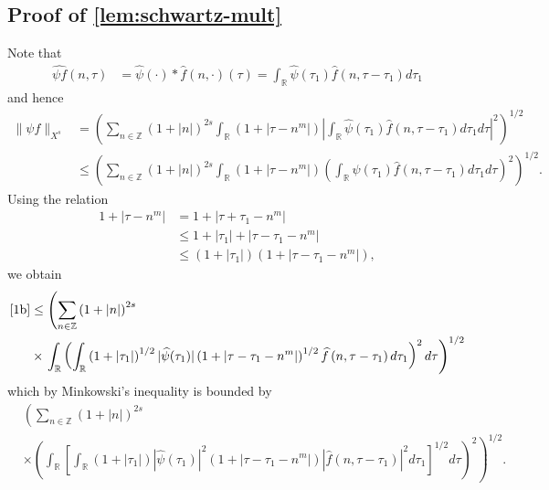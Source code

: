 \documentclass[12pt,reqno]{amsart}
\numberwithin{equation}{section}  %
\numberwithin{figure}{section}
\newcommand{\rr}{\mathbb{R}}
\newcommand{\zz}{\mathbb{Z}}
\newcommand{\wh}{\widehat}
\theoremstyle{plain}
\theoremstyle{definition}
\theoremstyle{remark}
\begin{document}
\subsection{Proof of \autoref{lem:schwartz-mult}}
Note that
%
%
\begin{equation*}
	\begin{split}
		\wh{\psi f}\left( n, \tau \right)
		& = \wh{\psi}(\cdot) * \wh{f}(n,
		\cdot)(\tau)
		= \int_\rr \wh{\psi}(\tau_1) \wh{f} \left( n, \tau - \tau_1 \right) 
		d\tau_1
	\end{split}
\end{equation*}
%
%
and hence
%
%
\begin{equation}
	\label{1b}
	\begin{split}
		\|\psi f\|_{X^s} 
		& = \left( \sum_{n \in \zz} \left (1 + |n| \right )^{2s} \int_\rr \left( 1 + | \tau -
		n^{m} | \right) | \int_\rr \wh{\psi}(\tau_1) \wh{f}\left( n, \tau -
		\tau_1
		\right)  d \tau_1 d \tau |^2 \right)^{1/2}
		\\
		& \le \left( \sum_{n \in \zz} \left (1 + |n| \right )^{2s} \int_\rr \left( 1 + | \tau -
		n^{m }
		|
		\right) \left( \int_\rr \wh{\psi}\left( \tau_1 \right) \wh{f}\left( n,
		\tau - \tau_1
		\right)  d \tau_1 d \tau \right)^2 \right)^{1/2}.
	\end{split}
\end{equation}
%
%
Using the relation
%
%
\begin{equation*}
	\begin{split}
		1 + | \tau - n^{m } |
		& = 1 + | \tau + \tau_1 - n^{m} |
		\\
		& \le 1 + | \tau_1 | + | \tau - \tau_1 - n^{m} |
		\\
		& \le \left( 1 + | \tau_1 | \right)\left( 1 + | \tau - \tau_1 -
		n^{m} | \right),
	\end{split}
\end{equation*}
%
%
we obtain
%
%
\begin{equation*}
	\begin{split}
		\eqref{1b}
		& \le \left( \sum_{n \in \zz} \left (1 + |n| \right )^{2s} \right.
		\\
		& \times \left . \int_\rr \left(
		\int_\rr \left( 1 + | \tau_1 | \right)^{1/2} | \wh{\psi}(\tau_1) |
		\left( 1 + | \tau - \tau_1 - n^{m} | \right)^{1/2} \wh{f}\left( n, \tau
		- \tau_1
		\right)d \tau_1
		\right)^2 d \tau \right)^{1/2}
	\end{split}
\end{equation*}
%
%
which by Minkowski's inequality is bounded by
%
%
\begin{equation}
	\label{2b}
	\begin{split}
		& \left( \sum_{n \in \zz} \left (1 + |n| \right )^{2s}  \right.
		\\
		& \times \left. \left( \int_\rr \left[ \int_\rr
		\left( 1 + | \tau_{1} | \right) | \wh{\psi}(\tau_1) |^2 \left( 1 + |
		\tau - \tau_1 - n^{m} |
		\right) | \wh{f}\left( n, \tau - \tau_1 \right) |^2 d \tau_1 
		\right]^{1/2} d \tau \right)^2 \right)^{1/2}.
	\end{split}
\end{equation}
\end{document}
